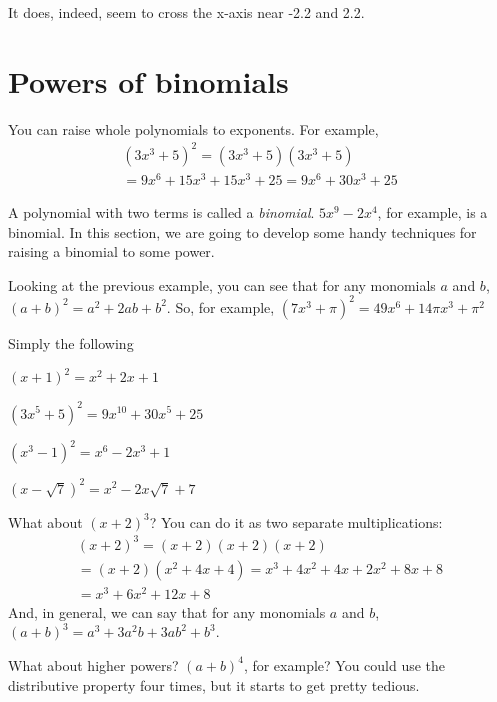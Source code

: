 It does, indeed, seem to cross the x-axis near -2.2 and 2.2.

\section{Powers of binomials}

You can raise whole polynomials to exponents. For example,
\begin{multline*}
  (3x^3 + 5)^2 = (3x^3 + 5)(3x^3 + 5) \\ = 9x^6 + 15x^3 + 15x^3 + 25 = 9x^6 + 30x^3 + 25 
\end{multline*}

A polynomial with two terms is called a \emph{binomial}. $5x^9 - 2x^4$,
for example, is a binomial. In this section, we are going to
develop some handy techniques for raising a binomial to some power.

Looking at the previous example, you can see that for any monomials $a$ and $b$, $(a + b)^2 = a^2 + 2ab + b^2$.
So, for example, $(7x^3 + \pi)^2 = 49x^6 + 14\pi x^3 + \pi^2$

\begin{Exercise}[title={Squaring binomials}, label=squaringbinomials]
  Simply the following
  
\end{Exercise}
\begin{Answer}[ref=squaringbinomials]
  $(x+1)^2 = x^2 + 2x + 1$

  $(3x^5 + 5)^2 = 9x^10 + 30x^5 + 25$

  $(x^3 - 1)^2 = x^6 - 2x^3 + 1$

  $(x - \sqrt{7})^2 = x^2 - 2x\sqrt{7} + 7$
\end{Answer}

What about $(x + 2)^3$? You can do it as two separate multiplications:
\begin{multline*}
  (x+2)^3 = (x+2)(x+2)(x+2) \\
  = (x + 2)(x^2 + 4x + 4) = x^3 + 4x^2 + 4x + 2x^2 + 8x + 8 \\
  = x^3 + 6x^2 + 12x + 8
\end{multline*}
And, in general, we can say that for any monomials $a$ and $b$, $(a + b)^3 = a^3 + 3a^2b + 3ab^2 + b^3$.

What about higher powers? $(a + b)^4$, for example? You could use the
distributive property four times, but it starts to get pretty tedious.

